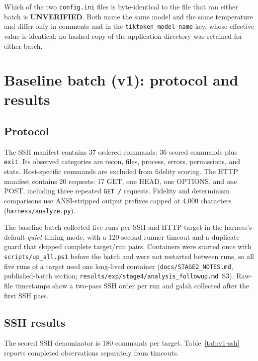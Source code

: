 \documentclass[a4paper,11pt]{article}
\begin{document}
Which of the two \texttt{config.ini} files is byte-identical to the file that
ran either batch is \textbf{UNVERIFIED}. Both name the same model and the same
temperature and differ only in comments and in the
\texttt{tiktoken\_model\_name} key, whose effective value is identical; no
hashed copy of the application directory was retained for either batch.

\section{Baseline batch (v1): protocol and results}

\subsection{Protocol}

The SSH manifest contains 37 ordered commands: 36 scored commands plus
\texttt{exit}. Its observed categories are recon, files, process, errors,
permissions, and state. Host-specific commands are excluded from fidelity
scoring. The HTTP manifest contains 20 requests: 17 GET, one HEAD,
one OPTIONS, and one POST, including three repeated \texttt{GET /} requests.
Fidelity and determinism comparisons use ANSI-stripped output prefixes capped
at 4,000 characters (\texttt{harness/analyze.py}).


The baseline batch collected five runs per SSH and HTTP target in the
harness's default \emph{quiet} timing mode, with a 120-second runner timeout
and a duplicate guard that skipped complete target/run pairs. Containers were
started once with \texttt{scripts/up\_all.ps1} before the batch and were not
restarted between runs, so all five runs of a target used one long-lived
container (\texttt{docs/STAGE2\_NOTES.md}, published-batch section;
\texttt{results/exp/stage4/\allowbreak{}analysis\_followup.md}~S3). Raw-file timestamps show
a two-pass SSH order per run and galah collected after the first SSH pass.

\subsection{SSH results}

The scored SSH denominator is 180 commands per target.
Table~\ref{tab:v1-ssh} reports completed observations separately from
timeouts.
\end{document}
